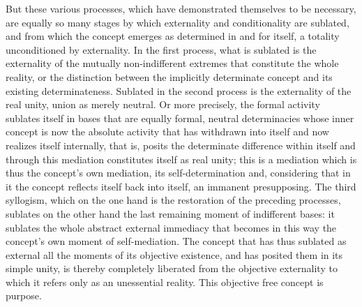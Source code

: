 But these various processes,
which have demonstrated themselves to be necessary,
are equally so many stages by which
externality and conditionality are sublated,
and from which the concept emerges as
determined in and for itself,
a totality unconditioned by externality.
In the first process, what is sublated is
the externality of the mutually non-indifferent extremes that
constitute the whole reality,
or the distinction between the implicitly
determinate concept and its existing determinateness.
Sublated in the second process is the externality
of the real unity, union as merely neutral.
Or more precisely, the formal activity sublates itself
in bases that are equally formal, neutral determinacies
whose inner concept is now the absolute activity
that has withdrawn into itself
and now realizes itself internally,
that is, posits the determinate difference within itself
and through this mediation constitutes itself as real unity;
this is a mediation which is thus the concept's
own mediation, its self-determination
and, considering that in it
the concept reflects itself back into itself,
an immanent presupposing.
The third syllogism, which on the one hand is
the restoration of the preceding processes,
sublates on the other hand the last
remaining moment of indifferent bases:
it sublates the whole abstract external immediacy
that becomes in this way
the concept's own moment of self-mediation.
The concept that has thus sublated as external
all the moments of its objective existence,
and has posited them in its simple unity,
is thereby completely liberated from
the objective externality to which
it refers only as an unessential reality.
This objective free concept is purpose.
